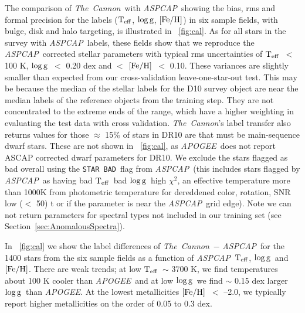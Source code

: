 \documentclass[12pt, preprint]{aastex}
\newcommand{\sectionname}{Section}
\newcommand{\tc}{\textsl{The~Cannon}}
\newcommand{\apogee}{\textsl{APOGEE}}
\newcommand{\aspcap}{\textsl{ASPCAP}}
\newcommand{\badstar}{\texttt{STAR BAD}}
\newcommand{\teff}{\mbox{$\rm T_{eff}$}}
\newcommand{\feh}{\mbox{$\rm [Fe/H]$}}
\newcommand{\logg}{\mbox{$\rm \log g$}}
\begin{document}
The comparison of \tc\ with \aspcap\, showing the bias, rms and formal precision for the labels (\teff , \logg , \feh ) in six sample fields, with bulge, disk and halo targeting, is illustrated in \figurename~\ref{fig:cal}. As for all stars in the survey with \aspcap\ labels, these fields show that we reproduce the \aspcap\ corrected stellar parameters with typical rms uncertainties of \teff\ $<$ 100 K, \logg\ $<$ 0.20 dex and $<$ \feh\ $<$ 0.10. These variances are slightly smaller than expected from our cross-validation leave-one-star-out test. This may be because the median of the stellar labels for the D10 survey object are near the median labels of the reference objects from the training step. 
They are not concentrated to the extreme ends of the range, which have a higher weighting in evaluating the test data with cross validation. 
 \tc 's label transfer also returns values for those $\approx$ 15\% of stars in DR10 are that must be main-sequence dwarf stars. 
These are not shown in \figurename~\ref{fig:cal}, as \apogee\ does not report ASCAP corrected dwarf parameters for DR10. 
We exclude the stars flagged as bad overall  using the \badstar\ flag from \aspcap\ (this includes stars flagged by \aspcap\ as having bad \teff\, bad \logg\, high $\chi^2$, an effective temperature more than 1000K from photometric temperature for dereddened color, rotation, SNR low ($<$ 50) t or if the parameter is near the \aspcap\ grid edge).  Note we can not return parameters for spectral types not included in our training set (see \sectionname~\ref{sec:AnomalousSpectra}). 

In \figurename~\ref{fig:cal} we show the label differences of \tc\ $-$ \aspcap\ for the 1400 stars from the six sample fields as a function of \aspcap\ \teff, \logg\ and \feh. There are weak trends; at low \teff\ $\sim$ 3700 K, we find temperatures about 100 K cooler than \apogee\ and at low \logg\ we find $\sim$ 0.15 dex larger \logg\ than \apogee. At the lowest metallicities \feh\ $<$ --2.0, we typically report higher metallicities on the order of 0.05 to 0.3 dex.
\end{document}

